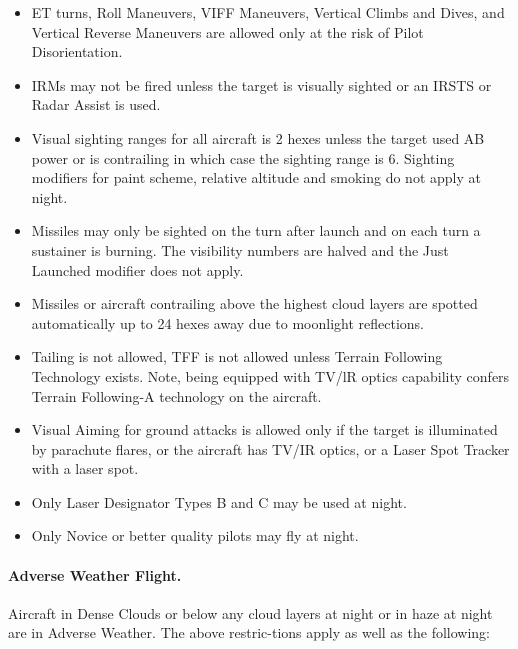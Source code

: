 \begin{itemize}

    \item ET turns, Roll Maneuvers, VIFF Maneuvers, Vertical Climbs and Dives, and Vertical Reverse Maneuvers are allowed only at the risk of Pilot Disorientation.

    \item IRMs may not be fired unless the target is visually sighted or an IRSTS or Radar Assist is used.

    \item Visual sighting ranges for all aircraft is 2 hexes unless the target used AB power or is contrailing in which case the sighting range is 6. Sighting modifiers for paint scheme, relative altitude and smoking do not apply at night.

    \item Missiles may only be sighted on the turn after launch and on each turn a sustainer is burning. The visibility numbers are halved and the Just Launched modifier does not apply.

    \item Missiles or aircraft contrailing above the highest cloud layers are spotted automatically up to 24 hexes away due to moonlight reflections.

    \item Tailing is not allowed, TFF is not allowed unless Terrain Following Technology exists. Note, being equipped with TV/lR optics capability confers Terrain Following-A technology on the aircraft.

    \item Visual Aiming for ground attacks is allowed only if the target is illuminated by parachute flares, or the aircraft has TV/IR optics, or a Laser Spot Tracker with a laser spot.

    \item Only Laser Designator Types B and C may be used at night.

    \item Only Novice or better quality pilots may fly at night.

\end{itemize}

\paragraph{Adverse Weather Flight.} Aircraft in Dense Clouds or below any cloud layers at night or in haze at night are in Adverse Weather. The above restric-tions apply as well as the following:

